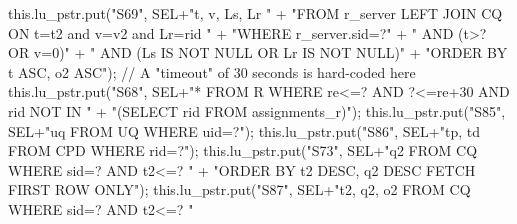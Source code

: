 this.lu_pstr.put("S69", SEL+"t, v, Ls, Lr "
      + "FROM r_server LEFT JOIN CQ ON t=t2 and v=v2 and Lr=rid "
      + "WHERE r_server.sid=?"
      + "   AND (t>? OR v=0)"
      + "   AND (Ls IS NOT NULL OR Lr IS NOT NULL)"
      + "ORDER BY t ASC, o2 ASC");
\eatline
{}\nwendcode{}\endmoddef{}
// A "timeout" of 30 seconds is hard-coded here
this.lu_pstr.put("S68", SEL+"* FROM R WHERE re<=? AND ?<=re+30 AND rid NOT IN  "
      + "(SELECT rid FROM assignments_r)");
\eatline
{}\nwendcode{}\endmoddef{}
this.lu_pstr.put("S85", SEL+"uq FROM UQ WHERE uid=?");
\eatline
{}\nwendcode{}\endmoddef{}
this.lu_pstr.put("S86", SEL+"tp, td FROM CPD WHERE rid=?");
\eatline
{}\nwendcode{}\endmoddef{}
this.lu_pstr.put("S73", SEL+"q2 FROM CQ WHERE sid=? AND t2<=? "
      + "ORDER BY t2 DESC, q2 DESC FETCH FIRST ROW ONLY");
\eatline
{}\nwendcode{}\endmoddef{}
this.lu_pstr.put("S87", SEL+"t2, q2, o2 FROM CQ WHERE sid=? AND t2<=? "
